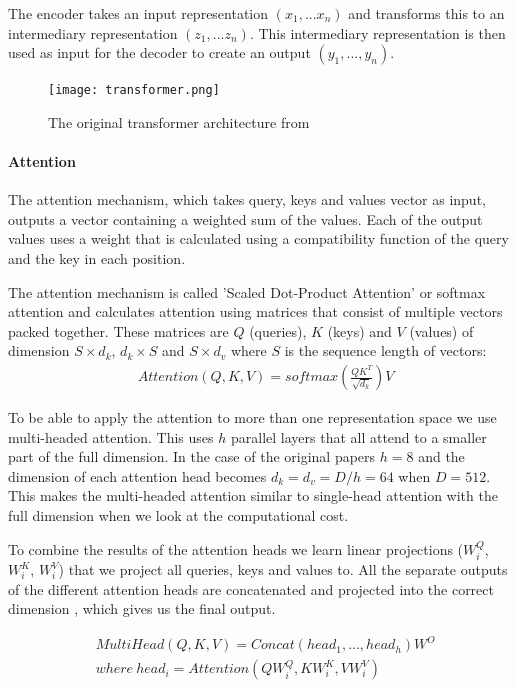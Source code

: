 The encoder takes an input representation $(x_1,...x_n)$ and transforms this to an intermediary representation $(z_1,...z_n)$. This intermediary representation is then used as input for the decoder to create an output $(y_1,...,y_n)$.

\begin{figure}[ht]
\centering
\texttt{[image: transformer.png]}
\caption{The original transformer architecture from \cite{vaswani_attention_2017}}
\label{fig:prelim:transformer-architecture}
\end{figure}


\paragraph{Attention}

The attention mechanism, which takes query, keys and values vector as input, outputs a vector containing a weighted sum of the values. Each of the output values uses a weight that is calculated using a compatibility  function of the query and the key in each position.

The attention mechanism \cite{vaswani_attention_2017} is called 'Scaled Dot-Product Attention' or softmax attention and calculates attention using matrices that consist of multiple vectors packed together. These matrices are $Q$ (queries), $K$ (keys) and $V$ (values) of dimension $S \times d_k$, $d_k \times S$ and $S \times d_v$ where $S$ is the sequence length of vectors:
\begin{align}
\label{eq:prelim:softmax-attention}
&Attention(Q, K, V) = softmax(\frac{QK^T} {\sqrt{d_k}})V
\end{align}

To be able to apply the attention to more than one representation space we use multi-headed attention. This uses $h$ parallel layers that all attend to a smaller part of the full dimension. In the case of the original papers $h = 8$ and the dimension of each attention head becomes $d_k = d_v = D / h = 64$ when $D = 512$. This makes the multi-headed attention similar to single-head attention with the full dimension when we look at the computational cost.

To combine the results of the attention heads we learn linear projections ($W_i^Q$, $W_i^K$, $W_i^V$) that we project all queries, keys and values to. All the separate outputs of the different attention heads are concatenated and projected into the correct dimension , which gives us the final output.

\begin{align}
&MultiHead(Q, K, V) = Concat(head_1, ..., head_h)W^O\\
& where\ head_i = Attention(QW_i^Q, KW_i^K, VW_i^V)
\end{align}


